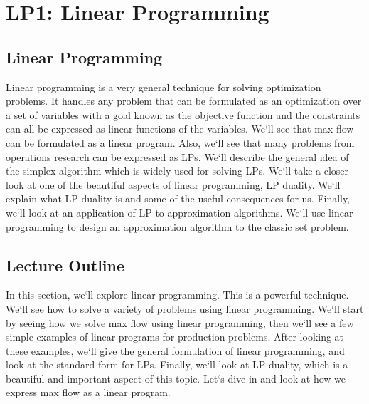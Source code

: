 \section{LP1: Linear Programming}

\subsection{Linear Programming}
Linear programming is a very general technique for solving optimization problems.
It handles any problem that can be formulated as an optimization over a set of variables with a goal known as the objective function and the constraints can all be expressed as linear functions of the variables.
We`ll see that max flow can be formulated as a linear program.
Also, we`ll see that many problems from operations research can be expressed as LPs.
We`ll describe the general idea of the simplex algorithm which is widely used for solving LPs.
We`ll take a closer look at one of the beautiful aspects of linear programming, LP duality.
We`ll explain what LP duality is and some of the useful consequences for us.
Finally, we`ll look at an application of LP to approximation algorithms.
We`ll use linear programming to design an approximation algorithm to the classic set problem.

\subsection{Lecture Outline}
In this section, we`ll explore linear programming.
This is a powerful technique.
We`ll see how to solve a variety of problems using linear programming.
We`ll start by seeing how we solve max flow using linear programming, then we`ll see a few simple examples of linear programs for production problems.
After looking at these examples, we`ll give the general formulation of linear programming, and look at the standard form for LPs.
Finally, we`ll look at LP duality, which is a beautiful and important aspect of this topic.
Let`s dive in and look at how we express max flow as a linear program.

